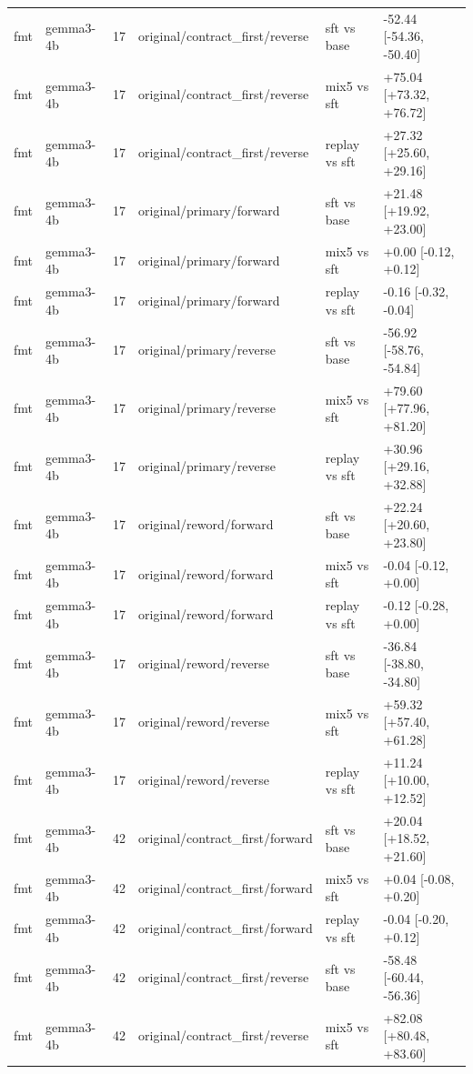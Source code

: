 \begin{table}[t]
\begin{tabular}{llllll}
fmt & gemma3-4b & 17 & original/contract\_first/reverse & sft vs base & -52.44 [-54.36, -50.40] \\
fmt & gemma3-4b & 17 & original/contract\_first/reverse & mix5 vs sft & +75.04 [+73.32, +76.72] \\
fmt & gemma3-4b & 17 & original/contract\_first/reverse & replay vs sft & +27.32 [+25.60, +29.16] \\
fmt & gemma3-4b & 17 & original/primary/forward & sft vs base & +21.48 [+19.92, +23.00] \\
fmt & gemma3-4b & 17 & original/primary/forward & mix5 vs sft & +0.00 [-0.12, +0.12] \\
fmt & gemma3-4b & 17 & original/primary/forward & replay vs sft & -0.16 [-0.32, -0.04] \\
fmt & gemma3-4b & 17 & original/primary/reverse & sft vs base & -56.92 [-58.76, -54.84] \\
fmt & gemma3-4b & 17 & original/primary/reverse & mix5 vs sft & +79.60 [+77.96, +81.20] \\
fmt & gemma3-4b & 17 & original/primary/reverse & replay vs sft & +30.96 [+29.16, +32.88] \\
fmt & gemma3-4b & 17 & original/reword/forward & sft vs base & +22.24 [+20.60, +23.80] \\
fmt & gemma3-4b & 17 & original/reword/forward & mix5 vs sft & -0.04 [-0.12, +0.00] \\
fmt & gemma3-4b & 17 & original/reword/forward & replay vs sft & -0.12 [-0.28, +0.00] \\
fmt & gemma3-4b & 17 & original/reword/reverse & sft vs base & -36.84 [-38.80, -34.80] \\
fmt & gemma3-4b & 17 & original/reword/reverse & mix5 vs sft & +59.32 [+57.40, +61.28] \\
fmt & gemma3-4b & 17 & original/reword/reverse & replay vs sft & +11.24 [+10.00, +12.52] \\
fmt & gemma3-4b & 42 & original/contract\_first/forward & sft vs base & +20.04 [+18.52, +21.60] \\
fmt & gemma3-4b & 42 & original/contract\_first/forward & mix5 vs sft & +0.04 [-0.08, +0.20] \\
fmt & gemma3-4b & 42 & original/contract\_first/forward & replay vs sft & -0.04 [-0.20, +0.12] \\
fmt & gemma3-4b & 42 & original/contract\_first/reverse & sft vs base & -58.48 [-60.44, -56.36] \\
fmt & gemma3-4b & 42 & original/contract\_first/reverse & mix5 vs sft & +82.08 [+80.48, +83.60] \\

\end{tabular}
\end{table}
